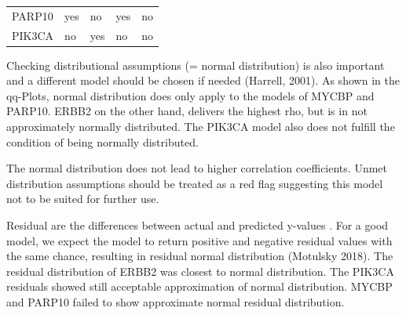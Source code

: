 \documentclass[]{article}
\begin{document}
\begin{longtable}[]{@{}lllll@{}}
\begin{minipage}[t]{0.10\columnwidth}
PARP10\strut
\end{minipage} & \begin{minipage}[t]{0.19\columnwidth}\raggedright
yes\strut
\end{minipage} & \begin{minipage}[t]{0.21\columnwidth}\raggedright
no\strut
\end{minipage} & \begin{minipage}[t]{0.16\columnwidth}\raggedright
yes\strut
\end{minipage} & \begin{minipage}[t]{0.20\columnwidth}\raggedright
no\strut
\end{minipage}\tabularnewline
\begin{minipage}[t]{0.10\columnwidth}\raggedright
PIK3CA\strut
\end{minipage} & \begin{minipage}[t]{0.19\columnwidth}\raggedright
no\strut
\end{minipage} & \begin{minipage}[t]{0.21\columnwidth}\raggedright
yes\strut
\end{minipage} & \begin{minipage}[t]{0.16\columnwidth}\raggedright
no\strut
\end{minipage} & \begin{minipage}[t]{0.20\columnwidth}\raggedright
no\strut
\end{minipage}\tabularnewline
\bottomrule
\end{longtable}

Checking distributional assumptions (= normal distribution) is also
important and a different model should be chosen if needed (Harrell,
2001). As shown in the qq-Plots, normal distribution does only apply to
the models of MYCBP and PARP10. ERBB2 on the other hand, delivers the
highest rho, but is in not approximately normally distributed. The
PIK3CA model also does not fulfill the condition of being normally
distributed.

The normal distribution does not lead to higher correlation
coefficients. Unmet distribution assumptions should be treated as a red
flag suggesting this model not to be suited for further use.

Residual are the differences between actual and predicted y-values . For
a good model, we expect the model to return positive and negative
residual values with the same chance, resulting in residual normal
distribution (Motulsky 2018). The residual distribution of ERBB2 was
closest to normal distribution. The PIK3CA residuals showed still
acceptable approximation of normal distribution. MYCBP and PARP10 failed
to show approximate normal residual distribution.
\end{document}
